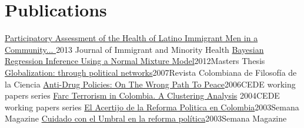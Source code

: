 \section{Publications}
\resumeSubHeadingListStart
\resumeSubheading
{\href{https://link.springer.com/article/10.1007/s10903-013-9897-2}{Participatory Assessment of the Health of Latino Immigrant Men in a Community... }}{2013}{ Journal of Immigrant and Minority Health }{}
\resumeSubheading
{\href{https://dsc.duq.edu/cgi/viewcontent.cgi?article=1875\&context=etd}{Bayesian Regression Inference Using a Normal Mixture Model}}{2012}{Masters Thesis}{}
\resumeSubheading
{\href{http://www.redalyc.org/pdf/414/41401702.pdf}{Globalization: through political networks}}{2007}{Revista Colombiana de Filosofía de la Ciencia}{}
\resumeSubheading
{\href{https://repositorio.uniandes.edu.co/server/api/core/bitstreams/c359a427-867a-4f71-9ac9-fe0553de8c65/content}{Anti-Drug Policies: On The Wrong Path To Peace}}{2006}{CEDE working papers series}{}
\resumeSubheading
{\href{https://repositorio.uniandes.edu.co/server/api/core/bitstreams/041beaed-2964-477b-a77d-cbfa49e9adb3/content}{Farc Terrorism in Colombia. A Clustering Analysis} }{2004}{CEDE working papers series}{}
\resumeSubheading
{\href{https://repositorio.uniandes.edu.co/server/api/core/bitstreams/e1cb028a-8f4e-4e51-a951-cdc30e3e54b3/content}{El Acertijo de la Reforma Politica en Colombia}}{2003}{Semana Magazine}{}
\resumeSubheading
{\href{http://www.semana.com/on-line/articulo/cuidado-umbral-reforma-politica-laura-macia-vergara-hernan-maldonado-jaramillo/57329-3}{Cuidado con el Umbral en la reforma política}}{2003}{Semana Magazine}{}

\resumeSubHeadingListEnd
\vspace{-15pt}

















